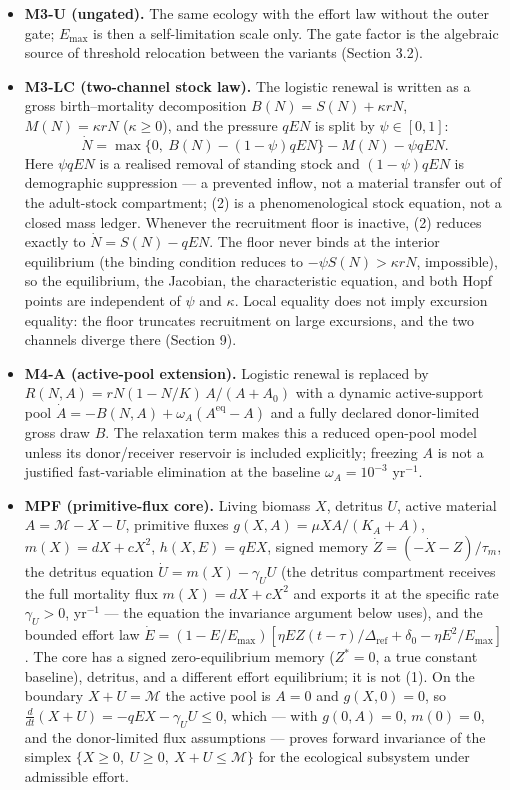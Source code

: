 \documentclass[11pt]{article}
\providecommand{\tightlist}{\setlength{\itemsep}{0pt}\setlength{\parskip}{0pt}}
\begin{document}
\begin{itemize}
\tightlist
\item
  \textbf{M3-U (ungated).} The same ecology with the effort law without
  the outer gate; \(E_{\max}\) is then a self-limitation scale only. The
  gate factor is the algebraic source of threshold relocation between
  the variants (Section 3.2).
\item
  \textbf{M3-LC (two-channel stock law).} The logistic renewal is
  written as a gross birth--mortality decomposition
  \(B(N) = S(N) + \kappa rN\), \(M(N) = \kappa rN\) (\(\kappa \ge 0\)),
  and the pressure \(qEN\) is split by \(\psi \in [0,1]\):
  \[\dot N = \max\{0,\ B(N) - (1-\psi)qEN\} - M(N) - \psi qEN. \tag{2}\]
  Here \(\psi qEN\) is a realised removal of standing stock and
  \((1-\psi)qEN\) is demographic suppression --- a prevented inflow, not
  a material transfer out of the adult-stock compartment; (2) is a
  phenomenological stock equation, not a closed mass ledger. Whenever
  the recruitment floor is inactive, (2) reduces exactly to
  \(\dot N = S(N) - qEN\). The floor never binds at the interior
  equilibrium (the binding condition reduces to
  \(-\psi S(N) > \kappa rN\), impossible), so the equilibrium, the
  Jacobian, the characteristic equation, and both Hopf points are
  independent of \(\psi\) and \(\kappa\). Local equality does not imply
  excursion equality: the floor truncates recruitment on large
  excursions, and the two channels diverge there (Section 9).
\item
  \textbf{M4-A (active-pool extension).} Logistic renewal is replaced by
  \(R(N,A) = rN(1 - N/K)\, A/(A + A_0)\) with a dynamic active-support
  pool \(\dot A = -B(N,A) + \omega_A(A^{\mathrm{eq}} - A)\) and a fully
  declared donor-limited gross draw \(B\). The relaxation term makes
  this a reduced open-pool model unless its donor/receiver reservoir is
  included explicitly; freezing \(A\) is not a justified fast-variable
  elimination at the baseline \(\omega_A = 10^{-3}\) yr\(^{-1}\).
\item
  \textbf{MPF (primitive-flux core).} Living biomass \(X\), detritus
  \(U\), active material \(A = \mathcal{M} - X - U\), primitive fluxes
  \(g(X,A) = \mu XA/(K_A + A)\), \(m(X) = dX + cX^2\), \(h(X,E) = qEX\),
  signed memory \(\dot Z = (-\dot X - Z)/\tau_m\), the detritus equation
  \(\dot U = m(X) - \gamma_U U\) (the detritus compartment receives the
  full mortality flux \(m(X) = dX + cX^2\) and exports it at the
  specific rate \(\gamma_U > 0\), yr\(^{-1}\) --- the equation the
  invariance argument below uses), and the bounded effort law
  \(\dot E = (1 - E/E_{\max})[\eta E Z(t-\tau)/\Delta_{\mathrm{ref}} + \delta_0 - \eta E^2/E_{\max}]\).
  The core has a signed zero-equilibrium memory (\(Z^* = 0\), a true
  constant baseline), detritus, and a different effort equilibrium; it
  is not (1). On the boundary \(X + U = \mathcal{M}\) the active pool is
  \(A = 0\) and \(g(X,0) = 0\), so
  \(\frac{d}{dt}(X+U) = -qEX - \gamma_U U \le 0\), which --- with
  \(g(0,A) = 0\), \(m(0) = 0\), and the donor-limited flux assumptions
  --- proves forward invariance of the simplex
  \(\{X \ge 0,\ U \ge 0,\ X + U \le \mathcal{M}\}\) for the ecological
  subsystem under admissible effort.
\end{itemize}
\end{document}
